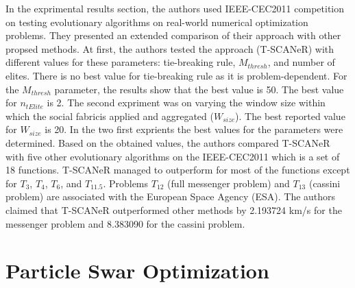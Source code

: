 In the exprimental results section, the authors used IEEE-CEC2011 competition on testing evolutionary algorithms on real-world numerical optimization problems. They presented an extended comparison of their approach with other propsed methods. At first, the authors tested the approach (T-SCANeR) with different values for these parameters: tie-breaking rule, $M_{thresh}$, and number of elites. There is no best value for tie-breaking rule as it is problem-dependent. For the $M_{thresh}$ parameter, the results show that the best value is 50. The best value for $n_{tElite}$ is 2. The second expriment was on varying the  window  size  within  which  the  social  fabricis  applied  and  aggregated ($W_{size}$). The best reported value for $W_{size}$ is 20. \newline
In the two first exprients the best values for the parameters were determined. Based on the obtained values, the authors compared T-SCANeR with five other evolutionary algorithms on the IEEE-CEC2011 which is a set of 18 functions. T-SCANeR managed to outperform for most of the functions except for $T_{3}$, $T_{4}$, $T_{6}$, and $T_{11.5}$. Problems $T_{12}$ (full messenger problem) and $T_{13}$ (cassini problem) are associated with the European Space Agency (ESA). The authors claimed that T-SCANeR outperformed other methods by 2.193724 km/s for the messenger problem and 8.383090 for the cassini problem.
\section{Particle Swar Optimization}
